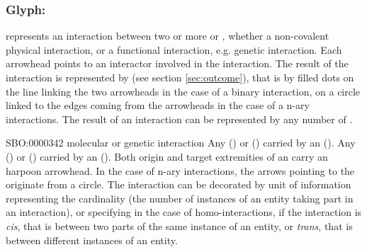 \color{blue}

\subsubsection{Glyph: }\label{sec:interaction}

 represents an interaction between two or more  or , whether a non-covalent physical interaction, or a functional interaction, e.g. genetic interaction. Each arrowhead points to an interactor involved in the interaction. The result of the interaction is represented by  (see section \ref{sec:outcome}), that is by filled dots on the line linking the two arrowheads in the case of a binary interaction, on a circle linked to the edges coming from the arrowheads in the case of a  n-ary interactions. The result of an interaction can be represented by any number of .

\begin{glyphDescription}
 \glyphSboTerm SBO:0000342 molecular or genetic interaction
 \glyphOrigin Any  () or   () carried by an  ().
 \glyphTarget Any  () or   () carried by an  ().
 \glyphEndPoint Both origin and target extremities of an  carry an harpoon arrowhead. In the case of n-ary interactions, the arrows pointing to the  originate from a circle. The interaction can be decorated by unit of information representing the cardinality (the number of instances of an entity taking part in an interaction), or specifying in the case of homo-interactions, if the interaction is \emph{cis}, that is between two parts of the same instance of an entity, or \emph{trans}, that is between different instances of an entity.
 \end{glyphDescription}


